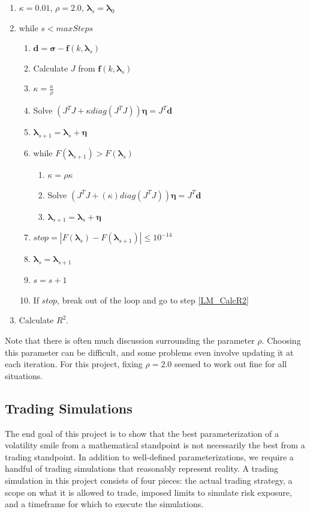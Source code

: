 \documentclass[12pt, a4paper, notitlepage]{article}
\numberwithin{equation}{subsection}
\numberwithin{figure}{subsection}
\numberwithin{table}{subsection}
\newcommand{\lambdaVect}{\pmb{\lambda}}
\begin{document}
\begin{enumerate}
	\item $\kappa = 0.01$, $\rho = 2.0$, $\lambdaVect_s = \lambdaVect_0$
	\item while $s < maxSteps$
    	\begin{enumerate}
        	\item $\pmb{d} = \pmb{\sigma} - \pmb{f}(k, \pmb{\lambda}_{s})$
            \item Calculate $J$ from $\pmb{f}(k, \pmb{\lambda}_{s})$
            \item $\kappa = \frac{\kappa}{\rho}$
            \item Solve $\left(J^{T}J + \kappa diag(J^{T}J)\right) \pmb{\eta} = J^{T} \pmb{d}$
            \item $\lambdaVect_{s+1} = \pmb{\lambda}_{s} + \pmb{\eta}$
            \item while $F(\lambdaVect_{s+1}) > F(\pmb{\lambda}_{s})$
                    \begin{enumerate}
                        \item $\kappa = \rho \kappa$              
                        \item Solve $\left(J^{T}J + (\kappa) diag(J^{T}J)\right) \pmb{\eta}= J^{T} \pmb{d}$
                        \item $\lambdaVect_{s+1} = \pmb{\lambda}_{s} + \pmb{\eta}$
                    \end{enumerate}
            \item $stop = |F(\lambdaVect_{s}) - F(\lambdaVect_{s+1})| \leq 10^{-14}$
            \item $\pmb{\lambda}_{s} = \lambdaVect_{s+1}$
            \item $s = s + 1$
            \item If $stop$, break out of the loop and go to step \ref{LM_CalcR2}
    	\end{enumerate}
   \item Calculate $R^2$. \label{LM_CalcR2}
\end{enumerate}
Note that there is often much discussion surrounding the parameter $\rho$.  Choosing this parameter can be difficult, and some problems even involve updating it at each iteration.  For this project, fixing $\rho = 2.0$ seemed to work out fine for all situations.

\subsection{Trading Simulations}\label{sec:TradingStrategies}
The end goal of this project is to show that the best parameterization of a volatility smile from a mathematical standpoint is not necessarily the best from a trading standpoint.  In addition to well-defined parameterizations, we require a handful of trading simulations that reasonably represent reality.  A trading simulation in this project consists of four pieces: the actual trading strategy, a scope on what it is allowed to trade, imposed limits to simulate risk exposure, and a timeframe for which to execute the simulations.
\end{document}

